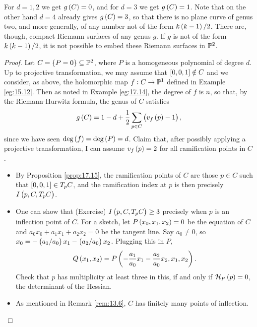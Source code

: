 \begin{remark}
For $ d = 1, 2 $ we get $ g\br{C} = 0 $, and for $ d = 3 $ we get $ g\br{C} = 1 $. Note that on the other hand $ d = 4 $ already gives $ g\br{C} = 3 $, so that there is no plane curve of genus two, and more generally, of any number not of the form $ k\br{k - 1} / 2 $. There are, though, compact Riemann surfaces of any genus $ g $. If $ g $ is not of the form $ k\br{k - 1} / 2 $, it is not possible to embed these Riemann surfaces in $ \P^2 $.
\end{remark}


\begin{proof}
Let $ C = \cbr{P = 0} \subseteq \P^2 $, where $ P $ is a homogeneous polynomial of degree $ d $. Up to projective transformation, we may assume that $ \sbr{0, 0, 1} \notin C $ and we consider, as above, the holomorphic map $ f : C \to \P^1 $ defined in Example \ref{eg:15.12}. Then as noted in Example \ref{eg:17.14}, the degree of $ f $ is $ n $, so that, by the Riemann-Hurwitz formula, the genus of $ C $ satisfies
$$ g\br{C} = 1 - d + \dfrac{1}{2}\sum_{p \in C} \br{v_f\br{p} - 1}, $$
since we have seen $ \deg\br{f} = \deg\br{P} = d $. Claim that, after possibly applying a projective transformation, I can assume $ v_f\br{p} = 2 $ for all ramification points in $ C $.
\begin{itemize}
\item By Proposition \ref{prop:17.15}, the ramification points of $ C $ are those $ p \in C $ such that $ \sbr{0, 0, 1} \in T_pC $, and the ramification index at $ p $ is then precisely $ I\br{p, C, T_pC} $.
\item One can show that (Exercise) $ I\br{p, C, T_pC} \ge 3 $ precisely when $ p $ is an inflection point of $ C $. For a sketch, let $ P\br{x_0, x_1, x_2} = 0 $ be the equation of $ C $ and $ a_0x_0 + a_1x_1 + a_2x_2 = 0 $ be the tangent line. Say $ a_0 \ne 0 $, so $ x_0 = -\br{a_1 / a_0}x_1 - \br{a_2 / a_0}x_2 $. Plugging this in $ P $,
$$ Q\br{x_1, x_2} = P\br{-\dfrac{a_1}{a_0}x_1 - \dfrac{a_2}{a_0}x_2, x_1, x_2}. $$
Check that $ p $ has multiplicity at least three in this, if and only if $ \HH_P\br{p} = 0 $, the determinant of the Hessian.
\item As mentioned in Remark \ref{rem:13.6}, $ C $ has finitely many points of inflection.
\end{itemize}

\pagebreak


\end{proof}

